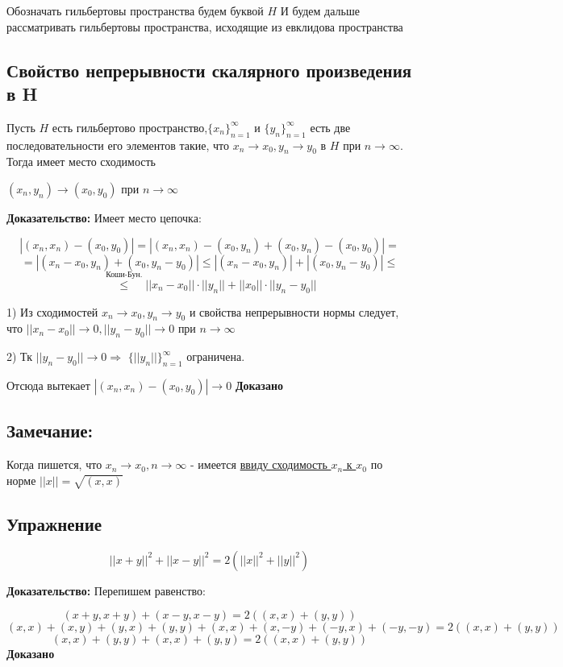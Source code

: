 \documentclass[12pt]{article}
\begin{document}
Обозначать гильбертовы пространства будем буквой $H$
И будем дальше рассматривать гильбертовы пространства, исходящие из
евклидова пространства 

\subsection{Свойство непрерывности скалярного произведения в H}
	Пусть $H$ есть гильбертово пространство,$\{ x_n \}_{n = 1}^{\infty}$ и $\{ y_n \}_{n = 1}^{\infty}$ есть две последовательности его элементов такие,
что $x_n \to x_0, y_n \to y_0$ в $H$ при $n \to \infty$. Тогда имеет место сходимость
	\begin{center}
		$(x_n, y_n) \to (x_0, y_0)$ при $ n \to \infty$
	\end{center}

\textbf{Доказательство:} Имеет место цепочка:

	$$|(x_n,x_n) - (x_0, y_0)| = |(x_n,x_n) - (x_0, y_n) + (x_0, y_n) - (x_0, y_0)| = $$
	$$ = |(x_n - x_0, y_n) + (x_0, y_n - y_0)| \leq |(x_n - x_0, y_n)| + |(x_0, y_n - y_0)| \leq$$
	$$\stackrel{\text{Коши-Бун.}}{\leq} ||x_n - x_0|| \cdot ||y_n|| + ||x_0||\cdot ||y_n - y_0||$$

1) Из сходимостей $x_n \to x_0, y_n \to y_0$ и свойства непрерывности нормы следует, что $||x_n - x_0|| \to 0, ||y_n - y_0|| \to 0$ при $n \to \infty$

2) Тк $||y_n - y_0|| \to 0 \Rightarrow$ 
 $\{ ||y_n|| \}_{n = 1}^{\infty}$ ограничена.
 
Отсюда вытекает $|(x_n,x_n) - (x_0, y_0)| \to 0$ \textbf{Доказано}

\subsection{Замечание:}
	Когда пишется, что $x_n \to x_0, n \to \infty$ - имеется \hyperref[eq103]{ввиду сходимость $x_n$ к $x_0$} по норме
		$||x|| = \sqrt{(x,x)} $

\subsection*{Упражнение}
		
	$$||x+y||^2 + ||x-y||^2 = 2(||x||^2 + ||y||^2)$$
	
\textbf{Доказательство:} Перепишем равенство:
		
	$$(x+y , x+y) + (x-y , x-y) = 2((x,x) + (y,y))$$
	$$(x,x) + (x,y) + (y,x) + (y,y) + (x,x) + (x,-y) + (-y,x) + (-y,-y) = 2((x,x) + (y,y))$$
	$$(x,x) + (y,y) + (x,x) + (y,y) = 2((x,x) + (y,y))$$ \textbf{Доказано}
	
\end{document}
